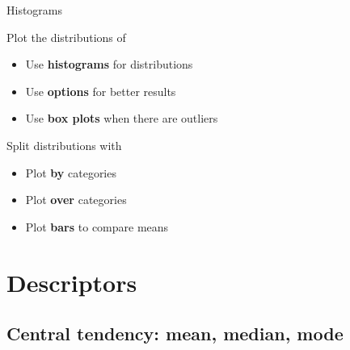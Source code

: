 \documentclass[t]{beamer}
\begin{document}
	\begin{frame}[t]{Histograms}
		
	  \begin{block}{Plot the distributions of }
			
			\begin{itemize}
				\item Use \textbf{histograms} for distributions %
					\hfill {}
				\item Use \textbf{options} for better results %
					\hfill {}
				\item Use \textbf{box plots} when there are outliers %
					\hfill {}
			\end{itemize}
	  \end{block}
	
	  \begin{block}{Split distributions with }
						
			\begin{itemize}
				\item Plot \textbf{by} categories %
					\hfill {}
				\item Plot \textbf{over} categories %
					\hfill {}
				\item Plot \textbf{bars} to compare means %
					\hfill {}
			\end{itemize}
	  \end{block}
		
	\end{frame}
	
	\section{Descriptors}

	\subsection{Central tendency: mean, median, mode}
\end{document}
